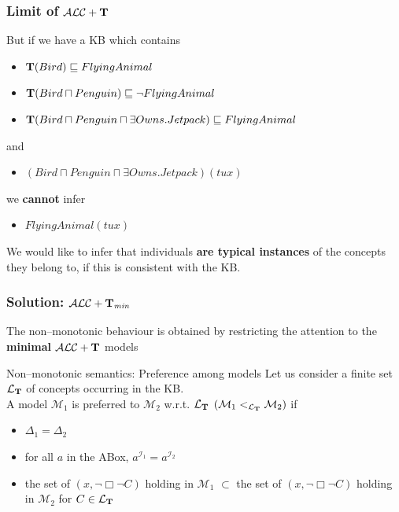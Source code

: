 \documentclass[serif,mathserif]{beamer}
\newcommand{\tip}{{\bf T}}
\newcommand{\alct}{\mathcal{ALC}+\tip}
\newcommand{\alctmin}{\mathcal{ALC}+\tip_{\mbox{\scriptsize \em min}}}
\newcommand{\LT}{\mathcal{L_\tip}}
\begin{document}
\begin{frame}
	\frametitle{Limit of $\alct$}
	\begin{example}
	But if we have a KB which contains
		\begin{itemize}
		\item $\tip(Bird) \sqsubseteq FlyingAnimal$
		\item $\tip(Bird \sqcap Penguin) \sqsubseteq \neg FlyingAnimal$
		\item $\tip(Bird \sqcap Penguin \sqcap \exists Owns.Jetpack) \sqsubseteq FlyingAnimal$
		\end{itemize}
		and		
		\begin{itemize}
		\item \alert{$(Bird \sqcap Penguin \sqcap \exists Owns.Jetpack) (tux)$}
		\end{itemize}
		we \textbf{cannot} infer
		\begin{itemize}
		\item $FlyingAnimal(tux)$	
		\end{itemize}	
	\end{example}
	
	We would like to infer that individuals \textbf{are typical instances} of the concepts they belong to, if this is consistent with the KB.
\end{frame}


\begin{frame}
	\frametitle{Solution: $\alctmin$}
		The non--monotonic behaviour is obtained by restricting the attention to the \textbf{minimal} $\alct$ models
	\begin{block}{Non--monotonic semantics: Preference among models}
	Let us consider a finite set $\LT$ of concepts occurring in the KB.\\[0.2cm]
	A model $\mathcal{M}_1$ is preferred to $\mathcal{M}_2$ w.r.t. $\LT$ $(\mathcal{M}_1 <_\LT \mathcal{M}_2)$ if
		\begin{itemize}
		\item $\Delta_1 = \Delta_2$	
		\item for all $a$ in the ABox, $a^{\mathcal{I}_1} = a^{\mathcal{I}_2}$
		\item the set of $(x, \neg\Box\neg C)$ holding in $\mathcal{M}_1$ $\subset$ the set of $(x, \neg\Box\neg C)$ holding in $\mathcal{M}_2$ for $C \in \LT$
		\end{itemize}
	\end{block}
\end{frame}
\end{document}
